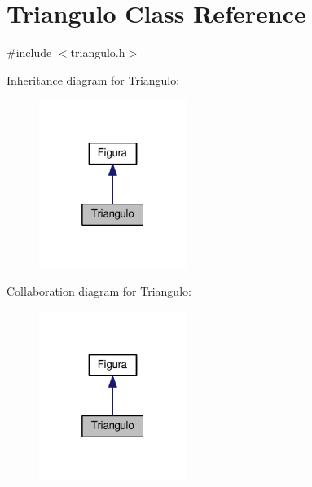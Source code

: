 \hypertarget{classTriangulo}{}\section{Triangulo Class Reference}
\label{classTriangulo}


{\ttfamily \#include $<$triangulo.\+h$>$}



Inheritance diagram for Triangulo\+:
\nopagebreak
\begin{figure}[H]
\begin{center}
\leavevmode
\includegraphics[width=136pt]{classTriangulo__inherit__graph}
\end{center}
\end{figure}


Collaboration diagram for Triangulo\+:
\nopagebreak
\begin{figure}[H]
\begin{center}
\leavevmode
\includegraphics[width=136pt]{classTriangulo__coll__graph}
\end{center}
\end{figure}
